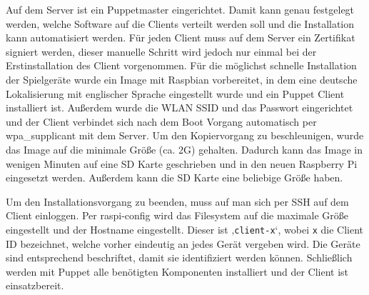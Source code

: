 Auf dem Server ist ein Puppetmaster eingerichtet.
Damit kann genau festgelegt werden, welche Software auf die Clients verteilt werden soll und die
Installation kann automatisiert werden.
Für jeden Client muss auf dem Server ein Zertifikat signiert werden, dieser manuelle Schritt wird
jedoch nur einmal bei der Erstinstallation des Client vorgenommen.
Für die möglichst schnelle Installation der Spielgeräte wurde ein Image mit Raspbian vorbereitet, in
dem eine deutsche Lokalisierung mit englischer Sprache eingestellt wurde und ein Puppet Client
installiert ist.
Außerdem wurde die WLAN SSID und das Passwort eingerichtet und der Client verbindet sich nach dem
Boot Vorgang automatisch per wpa\_supplicant mit dem Server.
Um den Kopiervorgang zu beschleunigen, wurde das Image auf die minimale Größe (ca. 2G) gehalten.
Dadurch kann das Image in wenigen Minuten auf eine SD Karte geschrieben und in den neuen Raspberry
Pi eingesetzt werden.
Außerdem kann die SD Karte eine beliebige Größe haben.

Um den Installationsvorgang zu beenden, muss auf man sich per SSH auf dem Client einloggen.
Per raspi-config wird das Filesystem auf die maximale Größe eingestellt und der Hostname
eingestellt.
Dieser ist ‚\texttt{client-x}‘, wobei \texttt{x} die Client ID bezeichnet, welche vorher eindeutig
an jedes Gerät vergeben wird.
Die Geräte sind entsprechend beschriftet, damit sie identifiziert werden können.
Schließlich werden mit Puppet alle benötigten Komponenten installiert und der Client ist
einsatzbereit.

